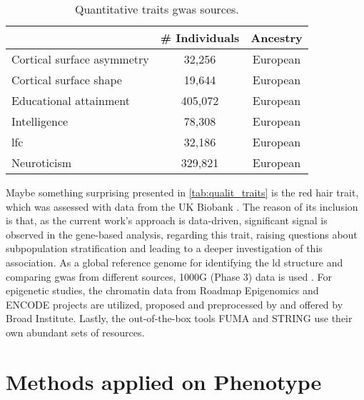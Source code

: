 \begin{table} [H]
	\centering
	\begin{tabular}{lcc}\toprule
		& \# Individuals & Ancestry\\\midrule
		Cortical surface asymmetry\cite{Sha2021} & 32,256 & European\\
		Cortical surface shape\cite{Naqvi2021} & 19,644 & European \\
		Educational attainment\cite{Okbay2016} &  405,072 & European \\
		Intelligence\cite{Sniekers2017} & 78,308 & European \\
		\acs{lfc}\cite{Mekki2022} & 32,186 & European \\
		Neuroticism\cite{Luciano2018} & 329,821 & European \\
		\bottomrule
	\end{tabular}
	\caption{Quantitative traits \ac{gwas} sources.}
	\label{tab:quantit_traits}
\end{table}
Maybe something surprising presented in \autoref{tab:qualit_traits} is the red hair trait, which was assessed with data from the UK Biobank \cite{Morgan2018}. The reason of its inclusion is that, as the current work's approach is data-driven, significant signal is observed in the gene-based analysis, regarding this trait, raising questions about subpopulation stratification and leading to a deeper investigation of this association. 
As a global reference genome for identifying the \ac{ld} structure and comparing \ac{gwas} from different sources, 1000G (Phase 3) data is used \cite{Auton2015}. For epigenetic studies, the chromatin data from Roadmap Epigenomics \cite{RoadmapEpigenomicsConsortium2015} and ENCODE \cite{Dunham2012} projects are utilized, proposed and preprocessed by \citet{Finucane2018} and offered by Broad Institute. Lastly, the out-of-the-box tools FUMA \cite{Watanabe2017} and STRING\cite{Szklarczyk2021} use their own abundant sets of resources.




\section{Methods applied on Phenotype}
\label{sec:methods_on_pheno}
